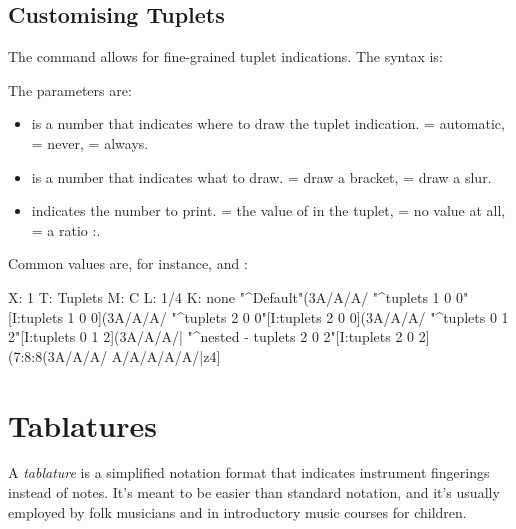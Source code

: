 \documentclass[a4paper,12pt]{book}
\begin{document}

\subsection{Customising Tuplets}
\label{sec:tuplets}

The  command allows for fine-grained tuplet
indications. The syntax is:

\medskip

   

\medskip

The parameters are:

\begin{itemize}
  
  \item {} is a number that indicates where to draw the tuplet
  indication.  = automatic,  = never,  = always.
  
  \item {} is a number that indicates what to draw.  = 
  draw a bracket,  = draw a slur.
  
  \item {} indicates the number to print.  = the value of
   in the tuplet,  = no value at all,  = a ratio 
  :.
  
\end{itemize}

Common values are, for instance,  and
:

\begin{abcsource}
X: 1
T: Tuplets
M: C
L: 1/4
K: none
%
"^Default"(3A/A/A/ "^tuplets 1 0 0"[I:tuplets 1 0 0](3A/A/A/ \bl
"^tuplets 2 0 0"[I:tuplets 2 0 0](3A/A/A/ \bl
"^tuplets 0 1 2"[I:tuplets 0 1 2](3A/A/A/|\bl
"^nested - tuplets 2 0 2"[I:tuplets 2 0 2](7:8:8(3A/A/A/ A/A/A/A/A/|z4]
\end{abcsource}



\section{Tablatures}
\label{sec:tablatures}

A \emph{tablature} is a simplified notation format that indicates
instrument fingerings instead of notes. It's meant to be easier than
standard notation, and it's usually employed by folk musicians and in
introductory music courses for children.
\end{document}

